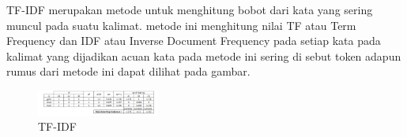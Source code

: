 \begin{enumerate}
        TF-IDF merupakan metode untuk menghitung bobot dari kata yang sering muncul pada suatu kalimat. metode ini menghitung nilai TF atau Term Frequency dan IDF atau Inverse Document Frequency pada setiap kata pada kalimat yang dijadikan acuan kata pada metode ini sering di sebut token adapun rumus dari metode ini dapat dilihat pada gambar.
        \begin{figure}[H]
            \includegraphics[width=4cm]{figures/1174040/chapter4/tfidf.png}
            \centering
            \caption{TF-IDF}
        \end{figure}

    \end{enumerate}

